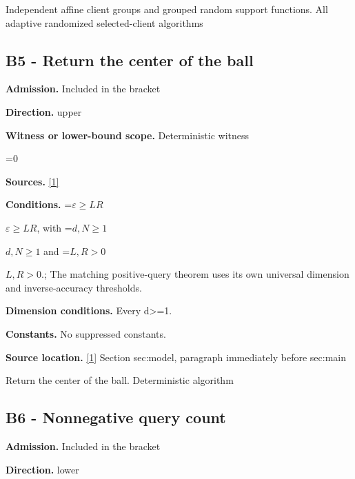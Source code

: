 \documentclass[10pt,a4paper]{article}
\newcommand{\AtlasMath}[1]{\par\begingroup\centering\setbox0=\hbox{$\displaystyle #1$}\ifdim\wd0>1.4\linewidth\typeout{ATLAS WIDE FORMULA: \the\wd0}\fi\ifdim\wd0>\linewidth\resizebox{\linewidth}{!}{\box0}\else\box0\fi\par\endgroup}
\newcommand{\AtlasInlineMath}[1]{\begingroup\setbox0=\hbox{$#1$}\ifdim\wd0>.4\linewidth\endgroup\AtlasMath{#1}\else\endgroup$#1$\fi}
\begin{document}
Independent affine client groups and grouped random support functions. All adaptive randomized selected-client algorithms



\subsection{B5 - Return the center of the ball}


\textbf{Admission.} Included in the bracket



\textbf{Direction.} upper



\textbf{Witness or lower-bound scope.} Deterministic witness



\AtlasMath{0}


\textbf{Sources.} \href{https://github.com/WU-Wendao/Colombo/blob/main/colombo_sensorium/Complexity_altas/data/sources/colombo/U05/manuscript.pdf}{[1]}



\textbf{Conditions.} \AtlasInlineMath{\varepsilon\ge LR}, with \AtlasInlineMath{d,N\ge1} and \AtlasInlineMath{L,R>0}.; The matching positive-query theorem uses its own universal dimension and inverse-accuracy thresholds.



\textbf{Dimension conditions.} Every d>=1.



\textbf{Constants.} No suppressed constants.



\textbf{Source location.} \href{https://github.com/WU-Wendao/Colombo/blob/main/colombo_sensorium/Complexity_altas/data/sources/colombo/U05/manuscript.pdf}{[1]} Section sec:model, paragraph immediately before sec:main



Return the center of the ball. Deterministic algorithm



\subsection{B6 - Nonnegative query count}


\textbf{Admission.} Included in the bracket



\textbf{Direction.} lower
\end{document}
